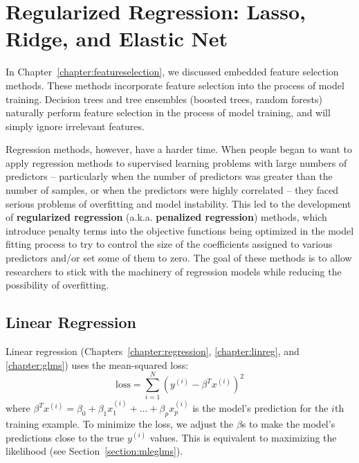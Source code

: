 \chapter{Regularized Regression: Lasso, Ridge, and Elastic Net \label{chapter:lassoridge}}

In Chapter~\ref{chapter:featureselection}, we discussed embedded feature selection methods. These methods incorporate feature selection into the process of model training. Decision trees and tree ensembles (boosted trees, random forests) naturally perform feature selection in the process of model training, and will simply ignore irrelevant features. 

Regression methods, however, have a harder time. When people began to want to apply regression methods to supervised learning problems with large numbers of predictors -- particularly when the number of predictors was greater than the number of samples, or when the predictors were highly correlated -- they faced serious problems of overfitting and model instability. This led to the development of \textbf{regularized regression} (a.k.a. \textbf{penalized regression}) methods, which introduce penalty terms into the objective functions being optimized in the model fitting process to try to control the size of the coefficients assigned to various predictors and/or set some of them to zero. The goal of these methods is to allow researchers to stick with the machinery of regression models while reducing the possibility of overfitting. 


\section{Linear Regression}

Linear regression (Chapters~\ref{chapter:regression}, \ref{chapter:linreg}, and \ref{chapter:glms}) uses the mean-squared loss:
$$ \text{loss} = \sum_{i=1}^N (y^{(i)} - \beta^T x^{(i)})^2 $$
where $\beta^T x^{(i)} = \beta_0 + \beta_1 x_1^{(i)} + \dots + \beta_p x_p^{(i)}$ is the model's prediction for the $i$th training example. To minimize the loss, we adjust the $\beta$s to make the model's predictions close to the true $y^{(i)}$ values. This is equivalent to maximizing the likelihood (see Section~\ref{section:mleglms}). 


